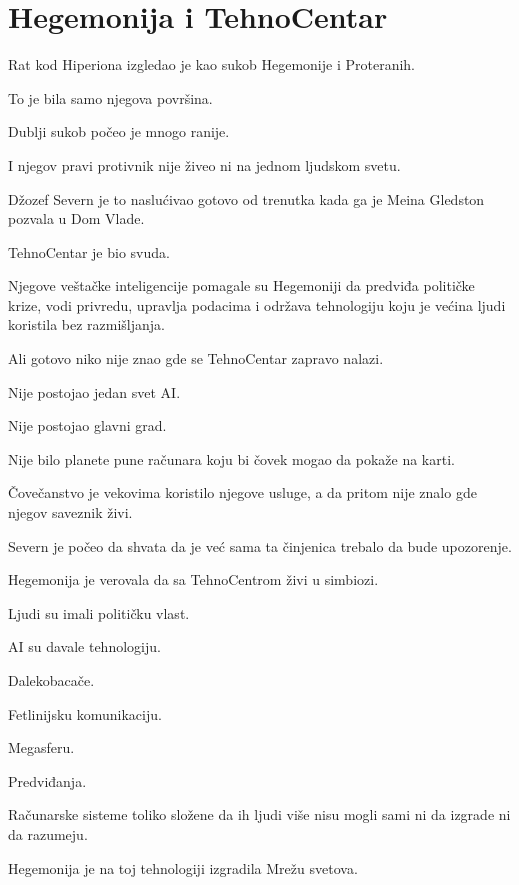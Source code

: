 
\chapter{Hegemonija i TehnoCentar}


Rat kod Hiperiona izgledao je kao sukob Hegemonije i Proteranih.

To je bila samo njegova površina.

Dublji sukob počeo je mnogo ranije.

I njegov pravi protivnik nije živeo ni na jednom ljudskom svetu.

\bigskip

Džozef Severn je to naslućivao gotovo od trenutka kada ga je Meina Gledston pozvala u Dom Vlade.

TehnoCentar je bio svuda.

Njegove veštačke inteligencije pomagale su Hegemoniji da predviđa političke krize, vodi privredu, upravlja podacima i održava tehnologiju koju je većina ljudi koristila bez razmišljanja.

Ali gotovo niko nije znao gde se TehnoCentar zapravo nalazi.

Nije postojao jedan svet AI.

Nije postojao glavni grad.

Nije bilo planete pune računara koju bi čovek mogao da pokaže na karti.

Čovečanstvo je vekovima koristilo njegove usluge, a da pritom nije znalo gde njegov saveznik živi.

Severn je počeo da shvata da je već sama ta činjenica trebalo da bude upozorenje.

\bigskip

Hegemonija je verovala da sa TehnoCentrom živi u simbiozi.

Ljudi su imali političku vlast.

AI su davale tehnologiju.

Dalekobacače.

Fetlinijsku komunikaciju.

Megasferu.

Predviđanja.

Računarske sisteme toliko složene da ih ljudi više nisu mogli sami ni da izgrade ni da razumeju.

Hegemonija je na toj tehnologiji izgradila Mrežu svetova.

